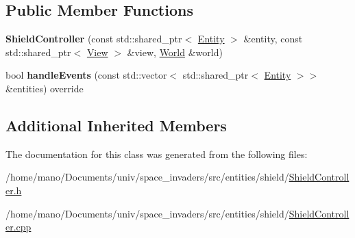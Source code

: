\subsection*{Public Member Functions}
\begin{DoxyCompactItemize}
\item 
\mbox{\label{classentities_1_1shield_1_1ShieldController_a91b1b04f46545a50201c14bd1fbda530}} 
{\bfseries Shield\+Controller} (const std\+::shared\+\_\+ptr$<$ \hyperlink{classentities_1_1Entity}{Entity} $>$ \&entity, const std\+::shared\+\_\+ptr$<$ \hyperlink{classentities_1_1View}{View} $>$ \&view, \hyperlink{classWorld}{World} \&world)
\item 
\mbox{\label{classentities_1_1shield_1_1ShieldController_a0c1bacca0231a39a1614147f65437987}} 
bool {\bfseries handle\+Events} (const std\+::vector$<$ std\+::shared\+\_\+ptr$<$ \hyperlink{classentities_1_1Entity}{Entity} $>$$>$ \&entities) override
\end{DoxyCompactItemize}
\subsection*{Additional Inherited Members}


The documentation for this class was generated from the following files\+:\begin{DoxyCompactItemize}
\item 
/home/mano/\+Documents/univ/space\+\_\+invaders/src/entities/shield/\hyperlink{ShieldController_8h}{Shield\+Controller.\+h}\item 
/home/mano/\+Documents/univ/space\+\_\+invaders/src/entities/shield/\hyperlink{ShieldController_8cpp}{Shield\+Controller.\+cpp}\end{DoxyCompactItemize}
